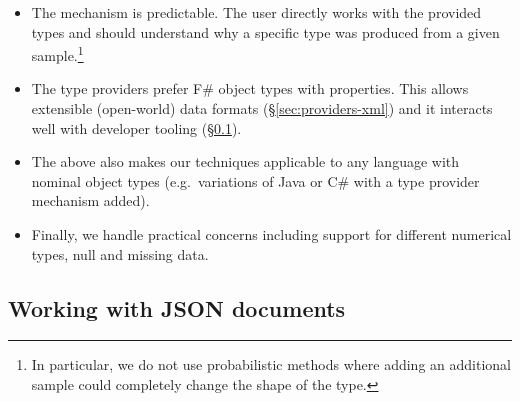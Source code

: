 \documentclass[10pt,preprint,clearpagebib]{sigplanconf}
\newcommand{\kvd}[1]{\textnormal{\textcolor{kvdclr}{\sffamily #1}}}
\begin{document}
\begin{itemize}
\item The mechanism is predictable. The user directly works with the provided types and should 
  understand why a specific type was produced from a given sample.\footnote{In particular, we do 
  not use probabilistic methods where adding an additional sample could completely change the 
  shape of the type.}

\item The type providers prefer F\# object types with properties. This allows extensible 
  (open-world) data formats (\S\ref{sec:providers-xml}) and it interacts well with developer tooling
  (\S\ref{sec:providers-json}). 

\item The above also makes our techniques applicable to any language with nominal 
  object types (e.g.~variations of Java or C\# with a type provider mechanism added).

\item Finally, we handle practical concerns including
  support for different numerical types, \kvd{null} and missing data.
\end{itemize}


\subsection{Working with JSON documents}
\label{sec:providers-json}
\end{document}
